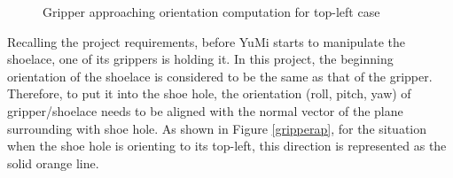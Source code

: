 \begin{figure}[H]
\centering
{}
\caption{Gripper approaching orientation computation for top-left case}
\end{figure}

Recalling the project requirements, before YuMi starts to manipulate the shoelace, one of its grippers is holding it. In this project, the beginning orientation of the shoelace is considered to be the same as that of the gripper. Therefore, to put it into the shoe hole, the orientation (roll, pitch, yaw) of gripper\slash shoelace needs to be aligned with the normal vector of the plane surrounding with shoe hole. As shown in Figure \ref{gripperap}, for the situation when the shoe hole is orienting to its top-left, this direction is represented as the solid orange line. 

